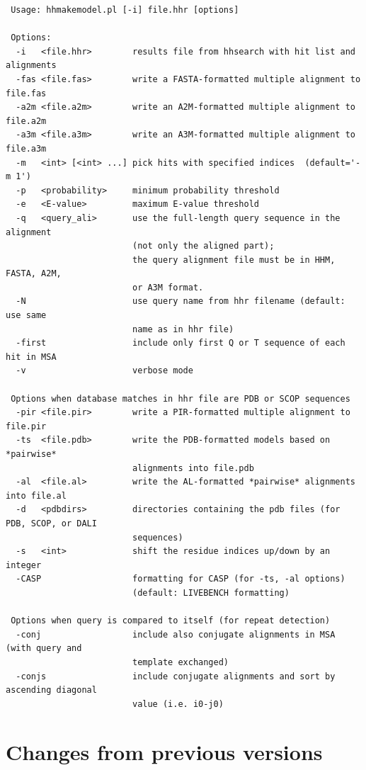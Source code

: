 \documentclass[11pt,a4paper]{article}
\begin{document}
\small \begin{verbatim}
 Usage: hhmakemodel.pl [-i] file.hhr [options]

 Options:
  -i   <file.hhr>        results file from hhsearch with hit list and alignments
  -fas <file.fas>        write a FASTA-formatted multiple alignment to file.fas
  -a2m <file.a2m>        write an A2M-formatted multiple alignment to file.a2m
  -a3m <file.a3m>        write an A3M-formatted multiple alignment to file.a3m
  -m   <int> [<int> ...] pick hits with specified indices  (default='-m 1')
  -p   <probability>     minimum probability threshold     
  -e   <E-value>         maximum E-value threshold      
  -q   <query_ali>       use the full-length query sequence in the alignment 
                         (not only the aligned part);
                         the query alignment file must be in HHM, FASTA, A2M,  
                         or A3M format.
  -N                     use query name from hhr filename (default: use same  
                         name as in hhr file)
  -first                 include only first Q or T sequence of each hit in MSA
  -v                     verbose mode

 Options when database matches in hhr file are PDB or SCOP sequences
  -pir <file.pir>        write a PIR-formatted multiple alignment to file.pir 
  -ts  <file.pdb>        write the PDB-formatted models based on *pairwise*  
                         alignments into file.pdb
  -al  <file.al>         write the AL-formatted *pairwise* alignments into file.al
  -d   <pdbdirs>         directories containing the pdb files (for PDB, SCOP, or DALI  
                         sequences)
  -s   <int>             shift the residue indices up/down by an integer           
  -CASP                  formatting for CASP (for -ts, -al options) 
                         (default: LIVEBENCH formatting)

 Options when query is compared to itself (for repeat detection) 
  -conj                  include also conjugate alignments in MSA (with query and  
                         template exchanged) 
  -conjs                 include conjugate alignments and sort by ascending diagonal  
                         value (i.e. i0-j0)
\end{verbatim} \normalsize

\section{Changes from previous versions}
\end{document}
